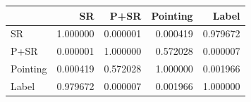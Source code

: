 \begin{tabular}{lrrrr}
\toprule
 & SR & P+SR & Pointing & Label \\
\midrule
SR & 1.000000 & 0.000001 & 0.000419 & 0.979672 \\
P+SR & 0.000001 & 1.000000 & 0.572028 & 0.000007 \\
Pointing & 0.000419 & 0.572028 & 1.000000 & 0.001966 \\
Label & 0.979672 & 0.000007 & 0.001966 & 1.000000 \\
\bottomrule
\end{tabular}
